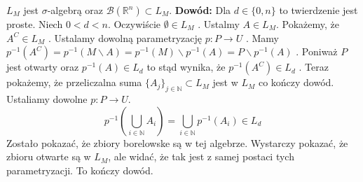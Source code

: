\begin{tw}
    $L_M$ jest $\sigma$-algebrą oraz $\mathcal{B}(\mathbb{R}^n) \subset L_M$.
    \newline
    \textbf{Dowód:}\newline
    Dla $d \in \{0, n\}$ to twierdzenie jest proste. Niech $0 < d < n$. Oczywiście $\emptyset \in L_M$ . Ustalmy $A \in L_M$. 
    Pokażemy, że $A^C \in L_M$ . Ustalamy dowolną parametryzację $p: P \rightarrow U$ . Mamy $p^{-1}(A^C) = p^{-1}(M \backslash A) = p^{-1}(M) \backslash p^{-1}(A) = P \backslash p^{-1}(A)$ . Poniważ $P$ jest otwarty oraz $p^{-1}(A) \in L_d$ to stąd wynika, że $p^{-1}(A^C) \in L_d$ .
    Teraz pokażemy, że przeliczalna suma $\{A_j\}_{j \in \mathbb{N}} \subset L_M$ jest w $L_M$ co kończy dowód. Ustaliamy dowolne $p: P \rightarrow U$. $$ 
    p^{-1}(\bigcup_{i \in \mathbb{N}} A_i ) = \bigcup_{i \in \mathbb{N}} p^{-1}(A_i) \in L_d
    $$ Zostało pokazać, że zbiory borelowske są w tej algebrze. Wystarczy pokazać, że zbioru otwarte są w $L_M$, ale widać, że tak jest z samej postaci tych parametryzacji. To kończy dowód.  
\end{tw}